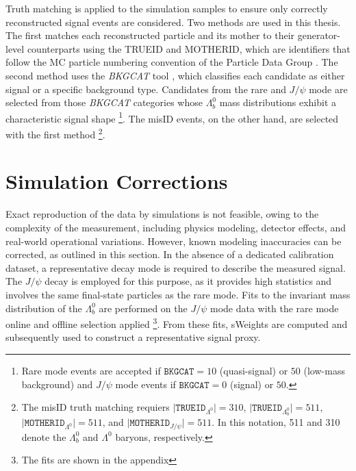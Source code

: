 Truth matching is applied to the simulation samples to ensure only correctly reconstructed signal events are considered. Two methods are used in this thesis. The first matches each reconstructed particle and its mother to their generator-level counterparts using the TRUEID and MOTHERID, which are identifiers that follow the MC particle numbering convention of the Particle Data Group \cite{pdg2024}. The second method uses the \textit{BKGCAT} tool \cite{LHCbBKGCAT}, which classifies each candidate as either signal or a specific background type. Candidates from the rare and $J/\psi$ mode are selected from those \textit{BKGCAT} categories whose $\Lambda_b^0$ mass distributions exhibit a characteristic signal shape \footnote{Rare mode events are accepted if $\texttt{BKGCAT} = 10$ (quasi-signal) or $50$ (low-mass background) and $J/\psi$ mode events if $\texttt{BKGCAT} = 0$ (signal) or $50$.}.  The misID events, on the other hand, are selected with the first method \footnote{The misID truth matching requiers $\vert \texttt{TRUEID}_{\Lambda^0} \vert = 310$, $\vert \texttt{TRUEID}_{\Lambda_b^0} \vert = 511$, $\vert \texttt{MOTHERID}_{\Lambda^0} \vert = 511$,  and $\vert \texttt{MOTHERID}_{J/\psi} \vert = 511$. In this notation, 511 and 310 denote the $\Lambda_b^0$ and $\Lambda^0$ baryons, respectively.}.


\section{Simulation Corrections}
\label{sec:run2_mc_corrections}
Exact reproduction of the data by simulations is not feasible, owing to the complexity of the measurement, including physics modeling, detector effects, and real-world operational variations. However, known modeling inaccuracies can be corrected, as outlined in this section. In the absence of a dedicated calibration dataset, a representative decay mode is required to describe the measured signal. The $J/\psi$ decay is employed for this purpose, as it provides high statistics and involves the same final-state particles as the rare mode. Fits to the invariant mass distribution of the $\Lambda_b^0$ are performed on the $J/\psi$ mode data with the rare mode online and offline selection applied \footnote{The fits are shown in the appendix}. From these fits, sWeights are computed and subsequently used to construct a representative signal proxy.

